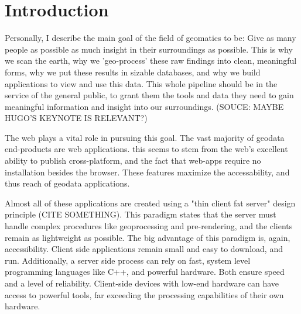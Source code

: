 \newpage
\section{Introduction}


Personally, I describe the main goal of the field of geomatics to be: Give as many people as possible as much insight in their surroundings as possible.
This is why we scan the earth, why we 'geo-process' these raw findings into clean, meaningful forms, why we put these results in sizable databases, and why we build applications to view and use this data.
This whole pipeline should be in the service of the general public, to grant them the tools and data they need to gain meaningful information and insight into our surroundings. (SOUCE: MAYBE HUGO'S KEYNOTE IS RELEVANT?)


The web plays a vital role in pursuing this goal. The vast majority of geodata end-products are web applications. this seems to stem from the web's excellent ability to publish cross-platform, and the fact that web-apps require no installation besides the browser. These features maximize the accessability, and thus reach of geodata applications.

Almost all of these applications are created using a "thin client fat server" design principle (CITE SOMETHING). 
This paradigm states that the server must handle complex procedures like geoprocessing and pre-rendering, and the clients remain as lightweight as possible. 
The big advantage of this paradigm is, again, accessibility. 
Client side applications remain small and easy to download,  and run. 
Additionally, a server side process can rely on fast, system level programming languages like C++, and powerful hardware. Both ensure speed and a level of reliability.  Client-side devices with low-end hardware can have access to powerful tools, far exceeding the processing capabilities of their own hardware. 

